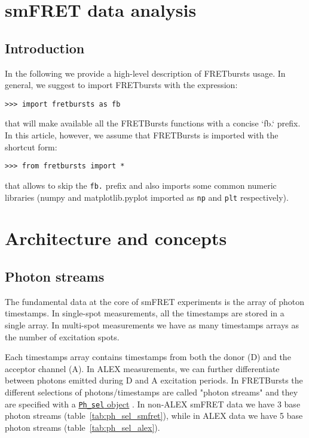 \section{smFRET data analysis}

\subsection{Introduction}

In the following we provide a high-level description of FRETbursts usage. In general, we suggest to import FRETbursts with the expression:

\begin{verbatim}
>>> import fretbursts as fb
\end{verbatim}

that will make available all the FRETBursts functions with a concise `fb.` prefix. In this article, however, we assume that FRETBursts is imported with the shortcut form:

\begin{verbatim}
>>> from fretbursts import *
\end{verbatim}

that allows to skip the \verb|fb.| prefix and also imports some common numeric libraries (numpy and matplotlib.pyplot imported as \verb|np| and \verb|plt| respectively).

\section{Architecture and concepts}
\subsection{Photon streams}
\label{sec:ph_streams}

The fundamental data at the core of smFRET experiments is the array of photon timestamps. In single-spot measurements, all the timestamps are stored in a single array. In multi-spot measurements we have as many timestamps arrays as the number of excitation spots.

Each timestamps array contains timestamps from both the donor (D) and the acceptor channel (A). In ALEX measurements, we can further differentiate between photons emitted during D and A excitation periods. In FRETBursts the different selections of photons/timestamps are called "photon streams" and they are specified with a \href{http://fretbursts.readthedocs.org/en/latest/ph_sel.html}{\texttt{Ph\_sel} object} . In non-ALEX smFRET data we have 3 base photon streams (table~\ref{tab:ph_sel_smfret}), while in ALEX data we have 5 base photon streams 
(table~\ref{tab:ph_sel_alex}).

